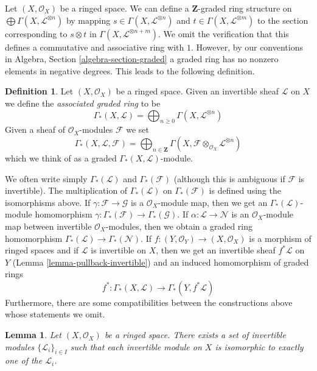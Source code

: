 \documentclass{stacks-project}
\theoremstyle{plain}
\newtheorem{lemma}[subsection]{Lemma}
\theoremstyle{definition}
\newtheorem{definition}[subsection]{Definition}
\theoremstyle{remark}
\numberwithin{equation}{subsection}
\begin{document}
\medskip\noindent
Let $(X, \mathcal{O}_X)$ be a ringed space. We can define a $\mathbf{Z}$-graded
ring structure on $\bigoplus \Gamma(X, \mathcal{L}^{\otimes n})$ by mapping
$s \in \Gamma(X, \mathcal{L}^{\otimes n})$ and
$t \in \Gamma(X, \mathcal{L}^{\otimes m})$ to the
section corresponding to $s \otimes t$ in
$\Gamma(X, \mathcal{L}^{\otimes n + m})$.
We omit the verification that this defines a commutative
and associative ring with $1$. However, by our conventions in
Algebra, Section \ref{algebra-section-graded}
a graded ring has no nonzero elements in negative degrees.
This leads to the following definition.

\begin{definition}
\label{definition-gamma-star}
Let $(X, \mathcal{O}_X)$ be a ringed space.
Given an invertible sheaf $\mathcal{L}$ on $X$ we define
the {\it associated graded ring} to be
$$
\Gamma_*(X, \mathcal{L})
=
\bigoplus\nolimits_{n \geq 0} \Gamma(X, \mathcal{L}^{\otimes n})
$$
Given a sheaf of $\mathcal{O}_X$-modules $\mathcal{F}$ we set
$$
\Gamma_*(X, \mathcal{L}, \mathcal{F})
=
\bigoplus\nolimits_{n \in \mathbf{Z}} \Gamma(X,
\mathcal{F} \otimes_{\mathcal{O}_X} \mathcal{L}^{\otimes n})
$$
which we think of as a graded $\Gamma_*(X, \mathcal{L})$-module.
\end{definition}

\noindent
We often write simply $\Gamma_*(\mathcal{L})$ and $\Gamma_*(\mathcal{F})$
(although this is ambiguous if $\mathcal{F}$ is invertible).
The multiplication of $\Gamma_*(\mathcal{L})$ on
$\Gamma_*(\mathcal{F})$ is defined using the isomorphisms
above. If $\gamma : \mathcal{F} \to \mathcal{G}$ is a $\mathcal{O}_X$-module
map, then we get an $\Gamma_*(\mathcal{L})$-module homomorphism
$\gamma : \Gamma_*(\mathcal{F}) \to \Gamma_*(\mathcal{G})$.
If $\alpha : \mathcal{L} \to \mathcal{N}$ is an $\mathcal{O}_X$-module
map between invertible $\mathcal{O}_X$-modules, then we obtain
a graded ring homomorphism $\Gamma_*(\mathcal{L}) \to \Gamma_*(\mathcal{N})$.
If $f : (Y, \mathcal{O}_Y) \to (X, \mathcal{O}_X)$
is a morphism of ringed spaces and if $\mathcal{L}$ is invertible
on $X$, then we get an invertible sheaf $f^*\mathcal{L}$ on $Y$
(Lemma \ref{lemma-pullback-invertible})
and an induced homomorphism of graded rings
$$
f^* :
\Gamma_*(X, \mathcal{L})
\longrightarrow
\Gamma_*(Y, f^*\mathcal{L})
$$
Furthermore, there are some compatibilities between the constructions
above whose statements we omit.

\begin{lemma}
\label{lemma-pic-set}
Let $(X, \mathcal{O}_X)$ be a ringed space.
There exists a set of invertible modules $\{\mathcal{L}_i\}_{i \in I}$
such that each invertible module on $X$ is isomorphic to exactly
one of the $\mathcal{L}_i$.
\end{lemma}
\end{document}
